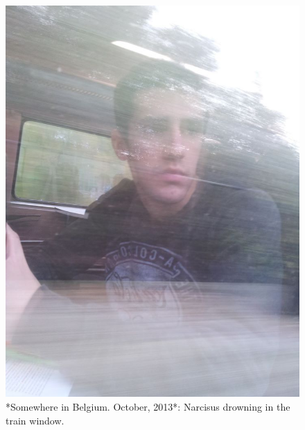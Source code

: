 \documentclass[]{book}
\begin{document}
\begin{figure}

{\centering \includegraphics[width=0.75\linewidth]{images/2014/train} 

}

\caption{*Somewhere in Belgium. October, 2013*: Narcisus drowning in the train window.}\label{fig:train}
\end{figure}
\end{document}
